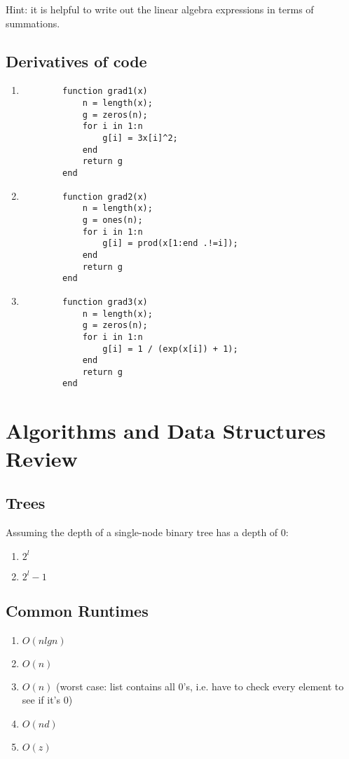 \documentclass{article}
\begin{document}
Hint: it is helpful to write out the linear algebra expressions in terms of summations.



\subsection{Derivatives of code}

\begin{enumerate}
\item
	\begin{verbatim}
		function grad1(x)
        	n = length(x);
        	g = zeros(n);
        	for i in 1:n
                g[i] = 3x[i]^2;
        	end
        	return g
		end
	\end{verbatim}
\item
	\begin{verbatim}
		function grad2(x)
        	n = length(x);
        	g = ones(n);
        	for i in 1:n
                g[i] = prod(x[1:end .!=i]);
        	end
        	return g
		end
	\end{verbatim}
\item
	\begin{verbatim}
		function grad3(x)
        	n = length(x);
        	g = zeros(n);
        	for i in 1:n
                g[i] = 1 / (exp(x[i]) + 1);
        	end
        	return g
		end
	\end{verbatim}
\end{enumerate}


\section{Algorithms and Data Structures Review}

\subsection{Trees}

Assuming the depth of a single-node binary tree has a depth of 0:
\begin{enumerate}
\item $2^l$
\item $2^l-1$
\end{enumerate}

\subsection{Common Runtimes}

\begin{enumerate}
\item $O(nlgn)$
\item $O(n)$
\item $O(n)$ (worst case: list contains all 0's, i.e. have to check every element to see if it's 0)
\item $O(nd)$
\item $O(z)$
\end{enumerate}
\end{document}
